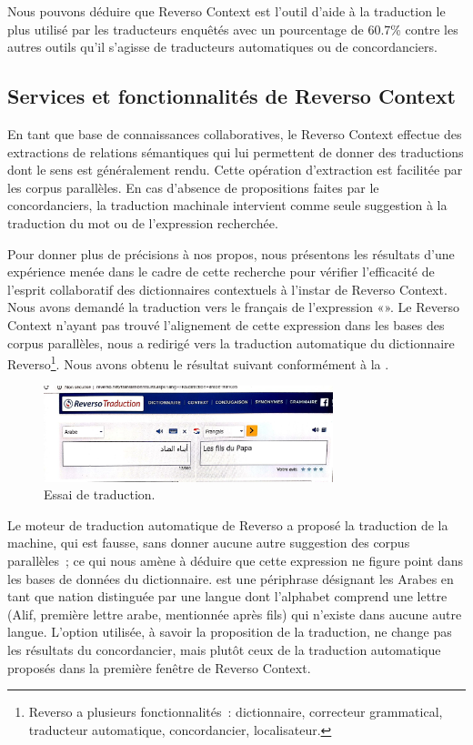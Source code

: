 \documentclass[french,english,brazil]{textolivre}
\begin{document}
Nous pouvons déduire que Reverso Context est l’outil d’aide à la traduction le plus utilisé par les traducteurs enquêtés avec un pourcentage de 60.7\% contre les autres outils qu’il s’agisse de traducteurs automatiques ou de concordanciers. 


\subsection{Services et fonctionnalités de Reverso Context}\label{sec-services}
En tant que base de connaissances collaboratives, le Reverso Context effectue des extractions de relations sémantiques qui lui permettent de donner des traductions dont le sens est généralement rendu. Cette opération d’extraction est facilitée par les corpus parallèles. En cas d’absence de propositions faites par le concordanciers, la traduction machinale intervient comme seule suggestion à la traduction du mot ou de l’expression recherchée.

Pour donner plus de précisions à nos propos, nous présentons les résultats d’une expérience menée dans le cadre de cette recherche pour vérifier l’efficacité de l’esprit collaboratif des dictionnaires contextuels à l’instar de Reverso Context. Nous avons demandé la traduction vers le français de l’expression «».
Le Reverso Context n’ayant pas trouvé l’alignement de cette expression dans les bases des corpus parallèles, nous a redirigé vers la traduction automatique du dictionnaire 
Reverso\footnote{
Reverso a plusieurs fonctionnalités : dictionnaire, correcteur grammatical, traducteur automatique, concordancier, localisateur.
}. Nous avons obtenu le résultat suivant conformément à la . 

\begin{figure}[htbp]
 \centering
 \includegraphics[width=0.75\textwidth]{figure05.png}
 \caption{Essai de traduction.}
 \label{fig-05}
\end{figure}

Le moteur de traduction automatique de Reverso a proposé la traduction de la machine, qui est fausse, sans donner aucune autre suggestion des corpus parallèles ; ce qui nous amène à déduire que cette expression ne figure point dans les bases de données du dictionnaire.
est une périphrase désignant les Arabes en tant que nation distinguée par une langue dont l’alphabet comprend une lettre (Alif, première lettre arabe, mentionnée après fils) qui n’existe dans aucune autre langue. L’option utilisée, à savoir la proposition de la traduction, ne change pas les résultats du concordancier, mais plutôt ceux de la traduction automatique proposés dans la première fenêtre de Reverso Context.
\end{document}
